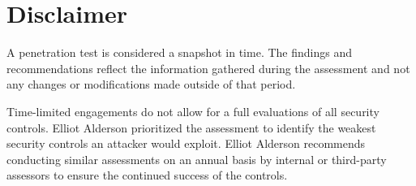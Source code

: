 \documentclass[a4paper]{article} %
\newcommand{\clientName}{Demo Corp}
\newcommand{\theAuthor}{Elliot Alderson}
\begin{document}
    \clearpage

    \section{Disclaimer} %
    A penetration test is considered a snapshot in time. The findings and recommendations reflect the information gathered during the assessment and not any changes or modifications made outside of that period.

    Time-limited engagements do not allow for a full evaluations of all security controls. {\theAuthor} prioritized the assessment to identify the weakest security controls an attacker would exploit. {\theAuthor} recommends conducting similar assessments on an annual basis by internal or third-party assessors to ensure the continued success of the controls.
    
    \clearpage
    
\end{document}

